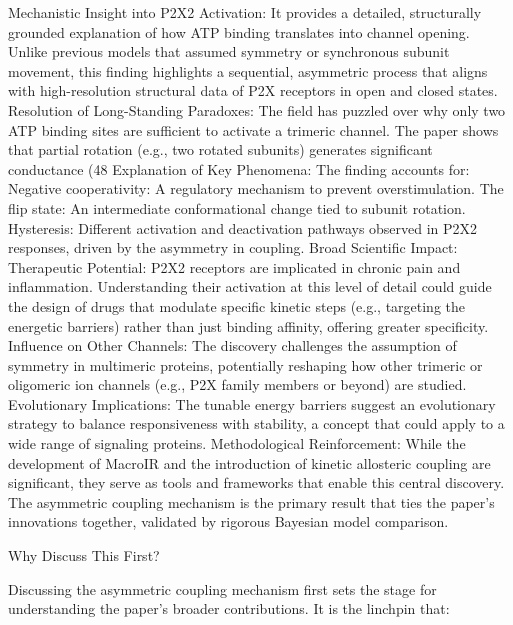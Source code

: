 \documentclass[a4paper,12pt]{article}
\begin{document}
		Mechanistic Insight into P2X2 Activation:
		It provides a detailed, structurally grounded explanation of how ATP binding translates into channel opening. Unlike previous models that assumed symmetry or synchronous subunit movement, this finding highlights a sequential, asymmetric process that aligns with high-resolution structural data of P2X receptors in open and closed states.
		Resolution of Long-Standing Paradoxes:
		The field has puzzled over why only two ATP binding sites are sufficient to activate a trimeric channel. The paper shows that partial rotation (e.g., two rotated subunits) generates significant conductance (48%
		Explanation of Key Phenomena:
		The finding accounts for:
		Negative cooperativity: A regulatory mechanism to prevent overstimulation.
		The flip state: An intermediate conformational change tied to subunit rotation.
		Hysteresis: Different activation and deactivation pathways observed in P2X2 responses, driven by the asymmetry in coupling.
		Broad Scientific Impact:
		Therapeutic Potential: P2X2 receptors are implicated in chronic pain and inflammation. Understanding their activation at this level of detail could guide the design of drugs that modulate specific kinetic steps (e.g., targeting the energetic barriers) rather than just binding affinity, offering greater specificity.
		Influence on Other Channels: The discovery challenges the assumption of symmetry in multimeric proteins, potentially reshaping how other trimeric or oligomeric ion channels (e.g., P2X family members or beyond) are studied.
		Evolutionary Implications: The tunable energy barriers suggest an evolutionary strategy to balance responsiveness with stability, a concept that could apply to a wide range of signaling proteins.
		Methodological Reinforcement:
		While the development of MacroIR and the introduction of kinetic allosteric coupling are significant, they serve as tools and frameworks that enable this central discovery. The asymmetric coupling mechanism is the primary result that ties the paper’s innovations together, validated by rigorous Bayesian model comparison.
		
		Why Discuss This First?
		
		Discussing the asymmetric coupling mechanism first sets the stage for understanding the paper’s broader contributions. It is the linchpin that:
		
\end{document}
